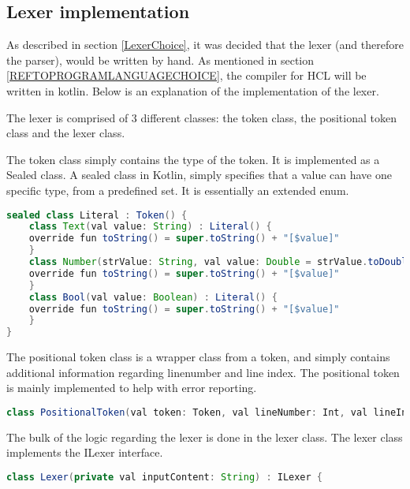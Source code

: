 \subsection{Lexer implementation}
As described in section \ref{LexerChoice}, it was decided that the lexer (and therefore the parser), would be written by hand.
As mentioned in section \ref{REFTOPROGRAMLANGUAGECHOICE}, the compiler for HCL will be written in kotlin.
Below is an explanation of the implementation of the lexer.

The lexer is comprised of 3 different classes: the token class, the positional token class and the lexer class.

The token class simply contains the type of the token. 
It is implemented as a Sealed class. 
A sealed class in Kotlin, simply specifies that a value can have one specific type, from a predefined set\cite{KotlinSealed}.
It is essentially an extended enum.
\begin{lstlisting}[language=java,label=lis:tokenClass,caption=A snippet from the token class .,firstnumber=9]
sealed class Literal : Token() {
	class Text(val value: String) : Literal() {
	override fun toString() = super.toString() + "[$value]"
	}
	class Number(strValue: String, val value: Double = strValue.toDouble()) : Literal() {
	override fun toString() = super.toString() + "[$value]"
	}
	class Bool(val value: Boolean) : Literal() {
	override fun toString() = super.toString() + "[$value]"
	}
}
\end{lstlisting}

The positional token class is a wrapper class from a token, and simply contains additional information regarding linenumber and line index.
The positional token is mainly implemented to help with error reporting.
\begin{lstlisting}[language=java,label=lis:PositionalTokenClass,caption=A snippet from the token class .,firstnumber=10]
class PositionalToken(val token: Token, val lineNumber: Int, val lineIndex: Int)
\end{lstlisting}

The bulk of the logic regarding the lexer is done in the lexer class.
The lexer class implements the ILexer interface.

\begin{lstlisting}[language=java,label=lis:Lexer,caption=The Lexer .,firstnumber=8]
class Lexer(private val inputContent: String) : ILexer {
\end{lstlisting}

